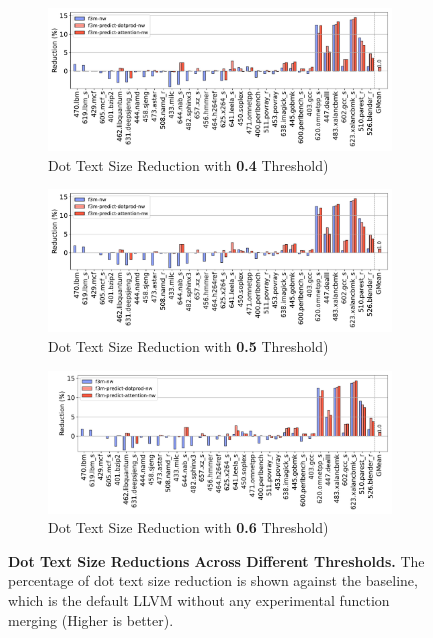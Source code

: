 \begin{figure}[tbh!]
    \centering
    \begin{subfigure}{\textwidth}
        \centering
        \includegraphics[scale=0.47]{Figures/CodeSizeAnalysis/0.4_dottext_code-size-reduction.pdf}
        \caption{Dot Text Size Reduction with \textbf{0.4} Threshold)}
        \label{fig:0.4BinSizeCodeSize}
    \end{subfigure}
    \begin{subfigure}{\textwidth}
        \centering
        \includegraphics[scale=0.47]{Figures/CodeSizeAnalysis/0.5_dottext_code-size-reduction.pdf}
        \caption{Dot Text Size Reduction with \textbf{0.5} Threshold)}
        \label{fig:0.5BinSizeCodeSize}
    \end{subfigure}
    \begin{subfigure}{\textwidth}
    \centering
        \includegraphics[scale=0.47]{Figures/CodeSizeAnalysis/0.6_dottext_code-size-reduction.pdf}
        \caption{Dot Text Size Reduction with \textbf{0.6} Threshold)}
        \label{fig:0.6BinSizeCodeSize}
    \end{subfigure}

    \caption{\textbf{Dot Text Size Reductions Across Different Thresholds.} The percentage of dot text size reduction is shown against the baseline, which is the default LLVM without any experimental function merging (Higher is better).}
\label{fig:DotTextSizeComparison}
\end{figure}

